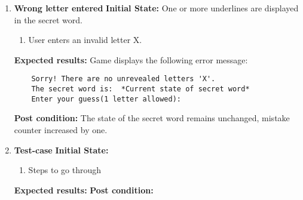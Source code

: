 \documentclass{article}
\begin{document}
\begin{flushleft}
\begin{enumerate}
	\item \textbf{Wrong letter entered}\newline
	\textbf{Initial State:} One or more underlines are displayed in the secret word.
	\begin{enumerate}
	\item User enters an invalid letter X.
	\end{enumerate}
	\textbf{Expected results:} Game displays the following error message: 
	\begin{verbatim}
	Sorry! There are no unrevealed letters 'X'. 
	The secret word is:  *Current state of secret word*
	Enter your guess(1 letter allowed):
	\end{verbatim}
	\textbf{Post condition:} The state of the secret word remains unchanged, mistake counter increased by one.

	\item \textbf{Test-case}\newline
	\textbf{Initial State:}
	\begin{enumerate}
	\item Steps to go through
	\end{enumerate}
	\textbf{Expected results:}\newline
	\textbf{Post condition:}\newline
	\end{enumerate}
	\end{flushleft} %
\end{document}
